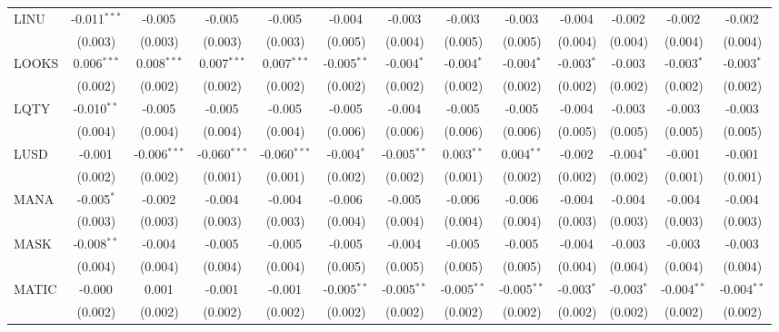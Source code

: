 \begin{table}[!htbp]
\begin{tabular}{@{\extracolsep{5pt}}lcccccccccccc}
 LINU & -0.011$^{***}$ & -0.005$^{}$ & -0.005$^{}$ & -0.005$^{}$ & -0.004$^{}$ & -0.003$^{}$ & -0.003$^{}$ & -0.003$^{}$ & -0.004$^{}$ & -0.002$^{}$ & -0.002$^{}$ & -0.002$^{}$ \\
  & (0.003) & (0.003) & (0.003) & (0.003) & (0.005) & (0.004) & (0.005) & (0.005) & (0.004) & (0.004) & (0.004) & (0.004) \\
 LOOKS & 0.006$^{***}$ & 0.008$^{***}$ & 0.007$^{***}$ & 0.007$^{***}$ & -0.005$^{**}$ & -0.004$^{*}$ & -0.004$^{*}$ & -0.004$^{*}$ & -0.003$^{*}$ & -0.003$^{}$ & -0.003$^{*}$ & -0.003$^{*}$ \\
  & (0.002) & (0.002) & (0.002) & (0.002) & (0.002) & (0.002) & (0.002) & (0.002) & (0.002) & (0.002) & (0.002) & (0.002) \\
 LQTY & -0.010$^{**}$ & -0.005$^{}$ & -0.005$^{}$ & -0.005$^{}$ & -0.005$^{}$ & -0.004$^{}$ & -0.005$^{}$ & -0.005$^{}$ & -0.004$^{}$ & -0.003$^{}$ & -0.003$^{}$ & -0.003$^{}$ \\
  & (0.004) & (0.004) & (0.004) & (0.004) & (0.006) & (0.006) & (0.006) & (0.006) & (0.005) & (0.005) & (0.005) & (0.005) \\
 LUSD & -0.001$^{}$ & -0.006$^{***}$ & -0.060$^{***}$ & -0.060$^{***}$ & -0.004$^{*}$ & -0.005$^{**}$ & 0.003$^{**}$ & 0.004$^{**}$ & -0.002$^{}$ & -0.004$^{*}$ & -0.001$^{}$ & -0.001$^{}$ \\
  & (0.002) & (0.002) & (0.001) & (0.001) & (0.002) & (0.002) & (0.001) & (0.002) & (0.002) & (0.002) & (0.001) & (0.001) \\
 MANA & -0.005$^{*}$ & -0.002$^{}$ & -0.004$^{}$ & -0.004$^{}$ & -0.006$^{}$ & -0.005$^{}$ & -0.006$^{}$ & -0.006$^{}$ & -0.004$^{}$ & -0.004$^{}$ & -0.004$^{}$ & -0.004$^{}$ \\
  & (0.003) & (0.003) & (0.003) & (0.003) & (0.004) & (0.004) & (0.004) & (0.004) & (0.003) & (0.003) & (0.003) & (0.003) \\
 MASK & -0.008$^{**}$ & -0.004$^{}$ & -0.005$^{}$ & -0.005$^{}$ & -0.005$^{}$ & -0.004$^{}$ & -0.005$^{}$ & -0.005$^{}$ & -0.004$^{}$ & -0.003$^{}$ & -0.003$^{}$ & -0.003$^{}$ \\
  & (0.004) & (0.004) & (0.004) & (0.004) & (0.005) & (0.005) & (0.005) & (0.005) & (0.004) & (0.004) & (0.004) & (0.004) \\
 MATIC & -0.000$^{}$ & 0.001$^{}$ & -0.001$^{}$ & -0.001$^{}$ & -0.005$^{**}$ & -0.005$^{**}$ & -0.005$^{**}$ & -0.005$^{**}$ & -0.003$^{*}$ & -0.003$^{*}$ & -0.004$^{**}$ & -0.004$^{**}$ \\
  & (0.002) & (0.002) & (0.002) & (0.002) & (0.002) & (0.002) & (0.002) & (0.002) & (0.002) & (0.002) & (0.002) & (0.002) \\

\end{tabular}
\end{table}
